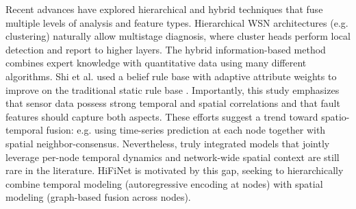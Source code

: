Recent advances have explored hierarchical and hybrid techniques that fuse multiple levels of analysis and feature types. Hierarchical WSN architectures (e.g. clustering) naturally allow multistage diagnosis, where cluster heads perform local detection and report to higher layers. The hybrid information-based method combines expert knowledge with quantitative data using many different algorithms. Shi et al. used a belief rule base with adaptive attribute weights to improve on the traditional static rule base \cite{Shi2024}. Importantly, this study emphasizes that sensor data possess strong temporal and spatial correlations and that fault features should capture both aspects. These efforts suggest a trend toward spatio-temporal fusion: e.g. using time-series prediction at each node together with spatial neighbor-consensus. Nevertheless, truly integrated models that jointly leverage per-node temporal dynamics and network-wide spatial context are still rare in the literature. HiFiNet is motivated by this gap, seeking to hierarchically combine temporal modeling (autoregressive encoding at nodes) with spatial modeling (graph-based fusion across nodes).
